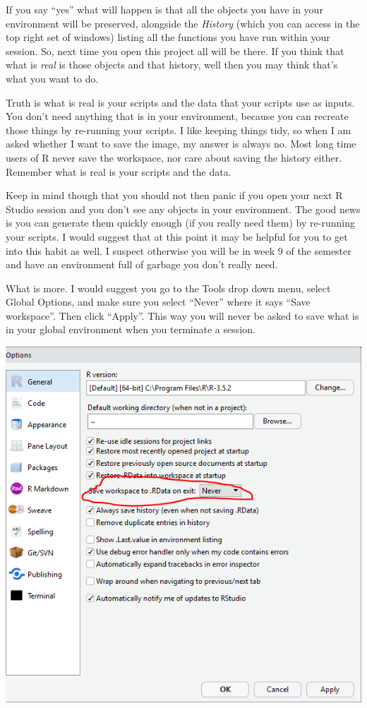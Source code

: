 \documentclass[]{book}
\theoremstyle{definition}
\theoremstyle{definition}
\theoremstyle{definition}
\theoremstyle{remark}
\begin{document}
If you say ``yes'' what will happen is that all the objects you have in
your environment will be preserved, alongside the \emph{History} (which
you can access in the top right set of windows) listing all the
functions you have run within your session. So, next time you open this
project all will be there. If you think that what is \emph{real} is
those objects and that history, well then you may think that's what you
want to do.

Truth is what is real is your scripts and the data that your scripts use
as inputs. You don't need anything that is in your environment, because
you can recreate those things by re-running your scripts. I like keeping
things tidy, so when I am asked whether I want to save the image, my
answer is always no. Most long time users of R never save the workspace,
nor care about saving the history either. Remember what is real is your
scripts and the data.

Keep in mind though that you should not then panic if you open your next
R Studio session and you don't see any objects in your environment. The
good news is you can generate them quickly enough (if you really need
them) by re-running your scripts. I would suggest that at this point it
may be helpful for you to get into this habit as well. I suspect
otherwise you will be in week 9 of the semester and have an environment
full of garbage you don't really need.

What is more. I would suggest you go to the Tools drop down menu, select
Global Options, and make sure you select ``Never'' where it says ``Save
workspace''. Then click ``Apply''. This way you will never be asked to
save what is in your global environment when you terminate a session.

\includegraphics{imgs/neversave.PNG}
\end{document}
